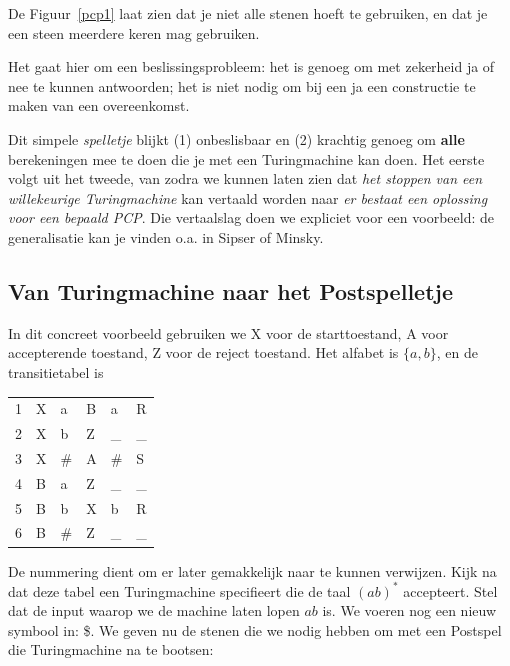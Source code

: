 De Figuur~\ref{pcp1} laat zien dat je niet alle stenen hoeft te
gebruiken, en dat je een steen meerdere keren mag gebruiken.


Het gaat hier om een beslissingsprobleem: het is genoeg om met
zekerheid ja of nee te kunnen antwoorden; het is niet nodig om bij
een ja een constructie te maken van een overeenkomst.


Dit simpele {\em spelletje} blijkt (1) onbeslisbaar en (2) krachtig
genoeg om {\bf alle} berekeningen mee te doen die je met een
Turingmachine kan doen. Het eerste volgt uit het tweede, van zodra we
kunnen laten zien dat {\em het stoppen van een willekeurige
Turingmachine} kan vertaald worden naar {\em er bestaat een oplossing
voor een bepaald PCP}. Die vertaalslag doen we expliciet voor een
voorbeeld: de generalisatie kan je vinden o.a. in Sipser of Minsky.

\subsection{Van Turingmachine naar het Postspelletje}

In dit concreet voorbeeld gebruiken we X voor de starttoestand, A voor
accepterende toestand, Z voor de reject toestand. Het alfabet is
$\{a,b\}$, en de transitietabel is

\begin{center}
\begin{tabular}{|r||l|l||l|l|l|}
\hline
1 & X & a & B & a & R \\
2 & X & b & Z & \_ & \_ \\
3 & X & \# & A & \# & S \\
4 & B & a  & Z & \_ & \_ \\
5 & B & b  & X & b  & R  \\
6 & B & \# & Z & \_ & \_ \\
\hline
\end{tabular}
\end{center}

De nummering dient om er later gemakkelijk naar te kunnen
verwijzen. Kijk na dat deze tabel een Turingmachine specifieert die de
taal $(ab)^*$ accepteert. Stel dat de input waarop we de machine laten
lopen $ab$ is.
%
We voeren nog een nieuw symbool in: \$. We geven nu de stenen die we
nodig hebben om met een Postspel die Turingmachine na te bootsen:

